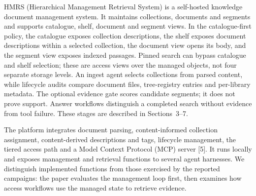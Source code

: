 \documentclass[11pt]{article}
\begin{document}
HMRS (Hierarchical Management Retrieval System) is a self-hosted
knowledge document management system. It maintains collections, documents and
segments and supports catalogue, shelf, document and segment views. In the
catalogue-first policy, the catalogue exposes collection descriptions, the
shelf exposes document descriptions within a selected collection, the document
view opens its body, and the segment view exposes indexed passages. Pinned
search can bypass catalogue and shelf selection; these are access views over
the managed objects, not four separate storage levels. An ingest agent selects
collections from parsed content, while lifecycle audits compare document files,
tree-registry entries and per-library metadata. The optional evidence gate
scores candidate segments; it does not prove support. Answer workflows
distinguish a completed search without evidence from tool failure. These
stages are described in Sections~3--7.

The platform integrates document parsing, content-informed collection assignment,
content-derived descriptions and tags, lifecycle management, the tiered access
path and a Model Context Protocol (MCP) server [5]. It runs locally and
exposes management and retrieval functions to several agent harnesses. We
distinguish implemented functions from those exercised by the reported
campaigns: the paper evaluates the management loop first, then examines how
access workflows use the managed state to retrieve evidence.
\end{document}
